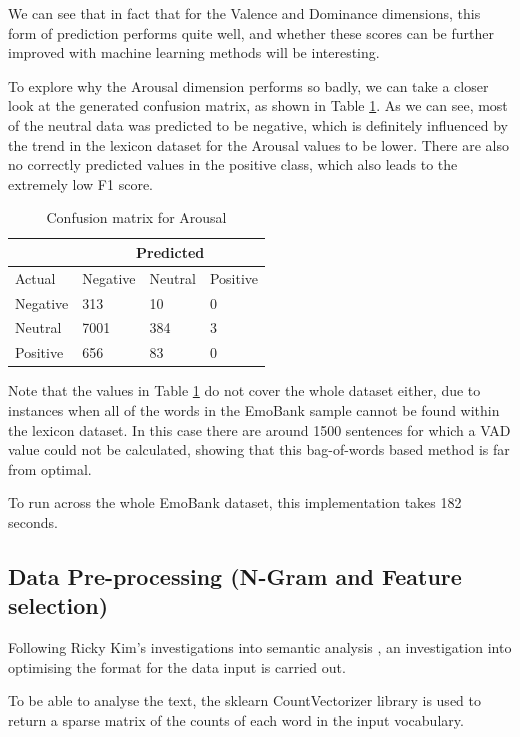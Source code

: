 We can see that in fact that for the Valence and Dominance dimensions, this form of prediction performs quite well, and whether these scores can be further improved with machine learning methods will be interesting.

To explore why the Arousal dimension performs so badly, we can take a closer look at the generated confusion matrix, as shown in Table \ref{lexicon:a:conmat}. As we can see, most of the neutral data was predicted to be negative, which is definitely influenced by the trend in the lexicon dataset for the Arousal values to be lower. There are also no correctly predicted values in the positive class, which also leads to the extremely low F1 score.

\begin{table}
\centering
\label{lexicon:a:conmat}
\caption{Confusion matrix for Arousal}
\begin{tabular}{ |p{3cm}|p{3cm}|p{3cm}|p{3cm}| }
 \hline
  & \multicolumn{3}{|c|}{Predicted} \\
 \hline
   Actual & Negative & Neutral & Positive \\
    \hline
    Negative &  313   &  10  & 0 \\
    Neutral & 7001 & 384 &  3 \\
    Positive & 656 & 83 &  0 \\

 \hline
\end{tabular}

\end{table}


Note that the values in Table \ref{lexicon:a:conmat} do not cover the whole dataset either, due to instances when all of the words in the EmoBank sample cannot be found within the lexicon dataset. In this case there are around 1500 sentences for which a VAD value could not be calculated, showing that this bag-of-words based method is far from optimal.

To run across the whole EmoBank dataset, this implementation takes 182 seconds.

\subsection{Data Pre-processing (N-Gram and Feature selection)}

Following Ricky Kim's investigations into semantic analysis \cite{towardsDS}, an investigation into optimising the format for the data input is carried out. 

To be able to analyse the text, the sklearn CountVectorizer library is used to return a sparse matrix of the counts of each word in the input vocabulary. \cite{sklearn}

